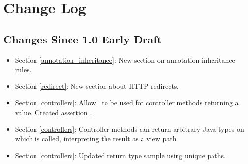 \chapter{Change Log}

\section{Changes Since 1.0 Early Draft}

\begin{itemize}
\item Section \ref{annotation_inheritance}: New section on annotation inheritance rules.
\item Section \ref{redirect}: New section about HTTP redirects.
\item Section \ref{controllers}: Allow \View\ to be used for controller methods returning a 
 value. Created assertion .
\item Section \ref{controllers}: Controller methods can return arbitrary Java types on which  is called, interpreting the result as a view path.
\item Section \ref{controllers}: Updated return type sample using unique paths.
\end{itemize}
